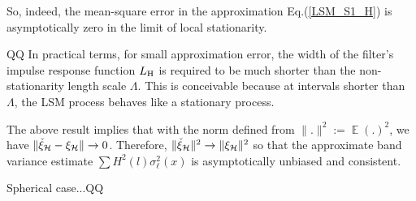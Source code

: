 \documentclass[12pt]{article}
\DeclareMathOperator{\Ex}{\mathbb{E}}
\begin{document}
So, indeed, the mean-square error in the approximation Eq.(\ref{LSM_S1_H})
is asymptotically zero in the limit of local stationarity.



QQ
In practical terms, for small approximation error, the width of the filter's impulse response function $L_{\rm H}$ is required
to be much shorter than the non-stationarity length scale $\Lambda$.
This is conceivable because at intervals shorter than  $\Lambda$, the LSM process 
behaves like a stationary process.

The above result implies that
with the norm defined from $\| . \|^2 := \Ex (.)^2  $,
we have $\| \check\xi_{\cal H} - \xi_{\cal H} \| \to 0$.
Therefore, $\| \check\xi_{\cal H}\|^2 \to \|\xi_{\cal H} \|^2$
so that the approximate band variance estimate
$ \sum  H^2(l) \sigma_\ell^2(x)$
is asymptotically unbiased and consistent.


Spherical case...QQ






\end{document}
